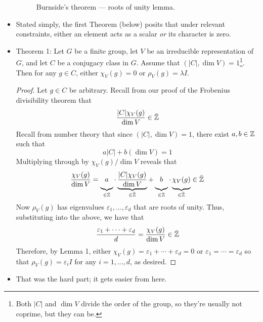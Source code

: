 \documentclass[../notes.tex]{subfiles}
\begin{document}
\begin{itemize}
\begin{figure}[h!]
        \caption{Burnside's theorem --- roots of unity lemma.}
        \label{fig:burnsideRootUniLemma}
    \end{figure}
    \item Stated simply, the first Theorem (below) posits that under relevant constraints, either an element acts as a scalar \emph{or} its character is zero.
    \item Theorem 1: Let $G$ be a finite group, let $V$ be an irreducible representation of $G$, and let $C$ be a conjugacy class in $G$. Assume that $(|C|,\dim V)=1$\footnote{Both $|C|$ and $\dim V$ divide the order of the group, so they're usually not coprime, but they can be.}. Then for any $g\in C$, either $\chi_V(g)=0$ or $\rho_V(g)=\lambda I$.
    \begin{proof}
        Let $g\in C$ be arbitrary. Recall from our proof of the Frobenius divisibility theorem that
        \begin{equation*}
            \frac{|C|\chi_V(g)}{\dim V} \in \bar{\mathbb{Z}}
        \end{equation*}
        Recall from number theory that since $(|C|,\dim V)=1$, there exist $a,b\in\mathbb{Z}$ such that
        \begin{equation*}
            a|C|+b(\dim V) = 1
        \end{equation*}
        Multiplying through by $\chi_V(g)/\dim V$ reveals that
        \begin{equation*}
            \frac{\chi_V(g)}{\dim V} = \underbrace{a\vphantom{\frac{|C|\chi_V(g)}{\dim V}}}_{\in\Z\vphantom{\bar{\Z}}}\cdot\underbrace{\frac{|C|\chi_V(g)}{\dim V}}_{\in\bar{\Z}}+\underbrace{b\vphantom{\frac{|C|\chi_V(g)}{\dim V}}}_{\in\Z\vphantom{\bar{\Z}}}\cdot\underbrace{\chi_V(g)\vphantom{\frac{|C|\chi_V(g)}{\dim V}}}_{\in\bar{\Z}} \in \bar{\Z}
        \end{equation*}
        Now $\rho_V(g)$ has eigenvalues $\varepsilon_1,\dots,\varepsilon_d$ that are roots of unity. Thus, substituting into the above, we have that
        \begin{equation*}
            \frac{\varepsilon_1+\cdots+\varepsilon_d}{d} = \frac{\chi_V(g)}{\dim V}
            \in \bar{\mathbb{Z}}
        \end{equation*}
        Therefore, by Lemma 1, either $\chi_V(g)=\varepsilon_1+\cdots+\varepsilon_d=0$ or $\varepsilon_1=\cdots=\varepsilon_d$ so that $\rho_V(g)=\varepsilon_iI$ for any $i=1,\dots,d$, as desired.
    \end{proof}
    \item That was the hard part; it gets easier from here.
        

\end{itemize}
\end{document}
